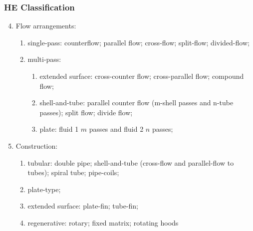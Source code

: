 \documentclass[10pt,compress,unknownkeysallowed]{beamer}
\begin{document}
\begin{frame}
 \frametitle{HE Classification}
      \begin{enumerate}\setcounter{enumi}{3}
          \item<1-> Flow arrangements:
             \begin{enumerate}
                 \item<1-> single-pass: counterflow; parallel flow; cross-flow; split-flow; divided-flow;
                 \item<2-> multi-pass: 
                    \begin{enumerate}
                       \item<2-> extended surface: cross-counter flow; cross-parallel flow; compound flow;
                       \item<2-> shell-and-tube: parallel counter flow (m-shell passes and n-tube passes); split flow; divide flow;
                       \item<2-> plate: fluid 1 $m$ passes and fluid 2 $n$ passes;
                    \end{enumerate}
             \end{enumerate}
          \item<3-> Construction:
              \begin{enumerate}
                 \item<3-> tubular: double pipe; shell-and-tube (cross-flow and parallel-flow to tubes); spiral tube; pipe-coils;
                 \item<3-> plate-type;
                 \item<3-> extended surface: plate-fin; tube-fin;
                 \item<3-> regenerative: rotary; fixed matrix; rotating hoods
              \end{enumerate}
   \end{enumerate}
\end{frame}
\end{document}
